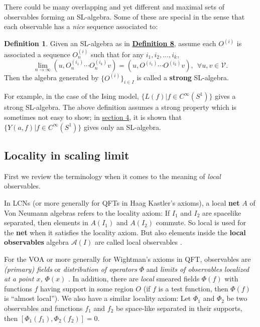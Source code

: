 \documentclass[twoside,11pt,titlepage]{amsart}
\renewcommand{\=}[1]{\stackrel{#1}{=}} %
\theoremstyle{definition}
\newtheorem{dfn}{Definition}
\theoremstyle{remark}
\begin{document}
There could be many overlapping and yet different and maximal sets of observables forming an SL-algebra. Some of these are special in the sense that each observable has a \textit{nice} sequence associated to:
\begin{dfn}\label{dfn9}
Given an SL-algebra as in \hyperref[dfn8]{\textbf{Definition 8}}, assume each $O^{(i)}$ is associated a sequence $O^{(i)}_n$  such that for any $i_1,i_2,\ldots,i_k$,
$$\lim\limits_{n\to\infty}(u,O^{(i_1)}_n\cdots O^{(i_k)}_nv)=(u,O^{(i_1)}\cdots O^{(i_k)}v), \ \ \forall u,v \in \mathcal{V}.$$
Then the algebra generated by $\{O^{(i)}\}_{i \in I}$ is called a \textbf{strong} SL-algebra.
\end{dfn}

For example, in the case of the Ising model, $\{L(f)| f \in C^{\infty}(S^1)\}$ gives a strong SL-algebra. The above definition assumes a strong property which is sometimes not easy to show; in \hyperref[4]{section 4}, it is shown that $\{Y(a,f)| f \in C^{\infty}(S^1)\}$ gives only an SL-algebra.


\subsection{Locality in scaling limit}\label{2.3}

\hfill \break
First we review the terminology when it comes to the meaning of \textit{local} observables. 

In LCNs (or more generally for QFTs in Haag Kastler's axioms), a local \textbf{net} $A$ of Von Neumann algebras refers to the locality axiom: If $I_1$ and $I_2$ are spacelike separated, then elements in $A(I_1)$ and $A(I_2)$ commute. So local is used for the \textbf{net} when it satisfies the locality axiom. But also elements inside the \textbf{local observables} algebra $\mathcal{A}(I)$ are called local observables \cite{haag2012local,carpi2015vertex}.

For the VOA or more generally for Wightman's axioms in QFT, observables are \textit{(primary) fields} or \textit{distribution of operators} $\Phi$ and \textit{limits of observables localized at a point $x$,} $\Phi(x)$ \cite{fredenhagen1981local}. In addition, there are \textit{local} smeared fields $\Phi(f)$ with functions $f$ having support in some region $O$ \cite[II.4.1]{haag2012local} (if $f$ is a test function, then $\Phi(f)$ is ``almost local''). We also have a similar locality axiom: Let $\Phi_1$ and $\Phi_2$ be two observables and functions $f_1$ and $f_2$ be space-like separated in their supports, then $[\Phi_1(f_1), \Phi_2(f_2)]= 0.$ 
\end{document}
